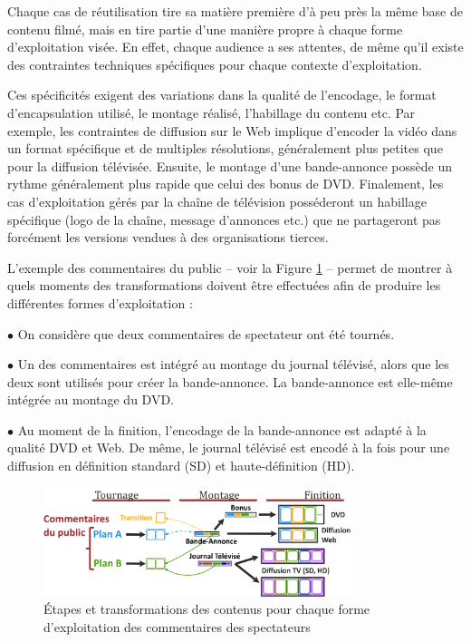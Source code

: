 Chaque cas de réutilisation tire sa matière première d'à peu près la même base de contenu filmé, mais en tire partie d'une manière propre à chaque forme d'exploitation visée. 
En effet, chaque audience a ses attentes, de même qu'il existe des contraintes techniques spécifiques pour chaque contexte d'exploitation. 

Ces spécificités exigent des variations dans la qualité de l'encodage, le format d'encapsulation utilisé, le montage réalisé, l'habillage du contenu etc. 
Par exemple, les contraintes de diffusion sur le Web implique d'encoder la vidéo dans un format spécifique et de multiples résolutions, généralement plus petites que pour la diffusion télévisée. 
Ensuite, le montage d'une bande-annonce possède un rythme généralement plus rapide que celui des bonus de DVD. 
Finalement, les cas d'exploitation gérés par la chaîne de télévision posséderont un habillage spécifique (logo de la chaîne, message d'annonces etc.) que ne partageront pas forcément les versions vendues à des organisations tierces. 

L'exemple des commentaires du public -- voir la Figure \ref{img:intro:reuse-process} -- permet de montrer à quels moments des transformations doivent être effectuées afin de produire les différentes formes d'exploitation :
\begin{liste} 
	\item[$\bullet$] On considère que deux commentaires de spectateur ont été tournés. 
	\item[$\bullet$] Un des commentaires est intégré au montage du journal télévisé, alors que les deux sont utilisés pour créer la bande-annonce. La bande-annonce est elle-même intégrée au montage du DVD. 
	\item[$\bullet$] Au moment de la finition, l'encodage de la bande-annonce est adapté à la qualité DVD et Web. De même, le journal télévisé est encodé à la fois pour une diffusion en définition standard (SD) et haute-définition (HD).
\end{liste}


\begin{figure}[ht!]
\centering
\includegraphics[width=0.8\textwidth]{images/EX-Content-Production-v7fr.png}
\caption{Étapes et transformations des contenus pour chaque forme d'exploitation des commentaires des spectateurs}
\label{img:intro:reuse-process}
\end{figure}

